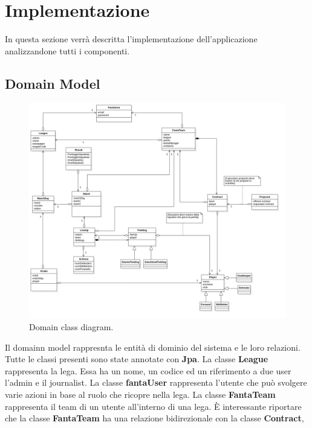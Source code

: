 \section{Implementazione}
In questa sezione verrà descritta l'implementazione dell'applicazione analizzandone tutti
i componenti.
\subsection{Domain Model}
\begin{figure}
    \centering
    \includegraphics[width=\textwidth]{Resources/graficiUML/ClassDiagram.png}        
    \caption{Domain class diagram.}
    \label{fig:domain_class_diagram2}
\end{figure}
Il domainn model rappresnta le entità di dominio del sistema e le loro relazioni.
Tutte le classi presenti sono state annotate con \textbf{Jpa}.
La classe \textbf{League} rappresenta la lega. Essa ha un nome, un codice ed un riferimento
a due user l'admin e il journalist. La classe \textbf{fantaUser} rappresenta l'utente che può
svolgere varie azioni in base al ruolo che ricopre nella lega. La classe \textbf{FantaTeam}
rappresenta il team di un utente all'interno di una lega. È interessante riportare
che la classe \textbf{FantaTeam} ha una relazione bidirezionale con la classe \textbf{Contract},
